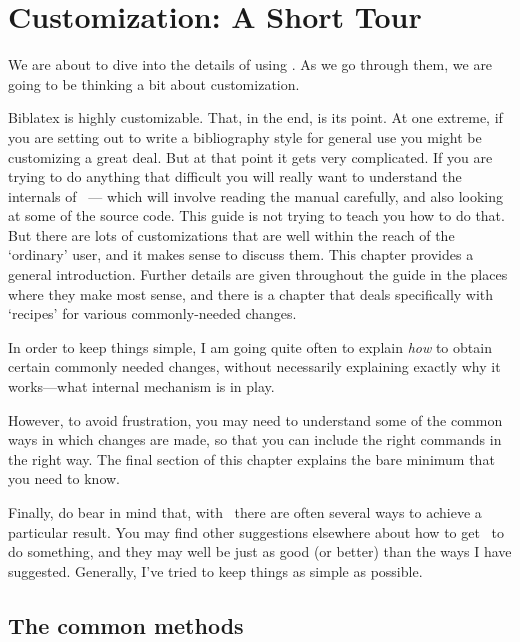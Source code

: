 \chapter{Customization: A Short Tour}\label{ch:customize1}

We are about to dive into the details of using \biblatex. As we go
through them, we are going to be thinking a bit about
customization.

\textsf{Biblatex} is highly customizable. That, in the end, is its
point. At one extreme, if you are setting out to write a bibliography
style for general use you might be customizing a great deal. But at
that point it gets very complicated. If you are trying to do anything
that difficult you will really want to understand the internals of
\biblatex\ --- which will involve reading the manual
carefully, and also looking at some of the
source code. This guide is not trying to teach you how to do that. But
there are lots of customizations that are well within the reach of the
`ordinary' user, and it makes sense to discuss them. This chapter
provides a general introduction. Further details are given throughout
the guide in the places where they make most sense, and there is a
chapter that deals specifically with
`recipes' for various commonly-needed changes.

In order to keep things simple, I am going quite often to explain
\emph{how} to obtain certain commonly needed changes, without
necessarily explaining exactly why it works---what internal mechanism
is in play.

However, to avoid frustration, you may need to understand some of the
common ways in which changes are made, so that you can include the
right commands in the right way. The final section of this chapter
explains the bare minimum that you need to know.

Finally, do bear in mind that, with \biblatex\ there are often several
ways to achieve a particular result. You may find other suggestions
elsewhere about how to get \biblatex\ to do something, and they may
well be just as good (or better) than the ways I have
suggested. Generally, I've tried to keep things as simple as possible.

\clearpage
\section{The common methods}

